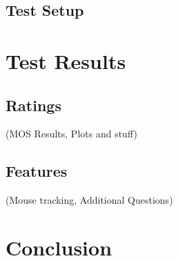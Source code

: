 \documentclass[conference]{IEEEtran}
\begin{document}
\subsection{Test Setup}


\section{Test Results}
\subsection{Ratings}
(MOS Results, Plots and stuff)

\subsection{Features}
(Mouse tracking, Additional Questions)


\section{Conclusion}






\end{document}
